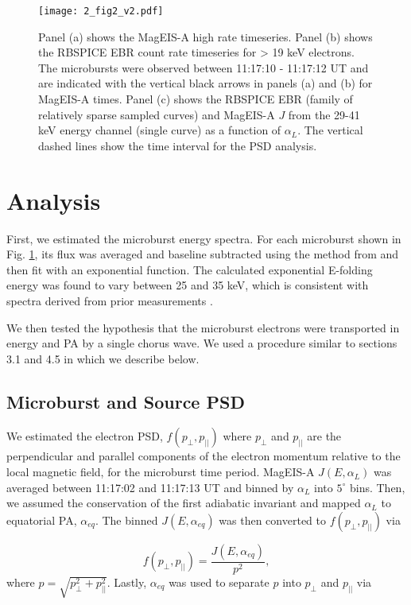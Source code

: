 \begin{figure}
\texttt{[image: 2\_fig2\_v2.pdf]}
\caption{Panel (a) shows the MagEIS-A high rate timeseries. Panel (b) shows the RBSPICE EBR count rate timeseries for > 19 keV electrons. The microbursts were observed between 11:17:10 - 11:17:12 UT and are indicated with the vertical black arrows in panels (a) and (b) for MagEIS-A times. Panel (c) shows the RBSPICE EBR (family of relatively sparse sampled curves) and MagEIS-A $J$ from the 29-41 keV energy channel (single curve) as a function of $\alpha_{L}$. The vertical dashed lines show the time interval for the PSD analysis.}
\label{fig2}
\end{figure}

\section{Analysis} \label{analysis} %
First, we estimated the microburst energy spectra. For each microburst shown in Fig. \ref{fig2}, its flux was averaged and baseline subtracted using the method from \citet{O'Brien2004} and then fit with an exponential function. The calculated exponential E-folding energy was found to vary between 25 and 35 keV, which is consistent with spectra derived from prior measurements \citep{Datta1997, Lee2005, Lee2012}.

We then tested the hypothesis that the microburst electrons were transported in energy and PA by a single chorus wave. We used a procedure similar to sections 3.1 and 4.5 in \citet{Meredith2002} which we describe below.

\subsection{Microburst and Source PSD} \label{psd_sec}
We estimated the electron PSD, $f(p_\perp, p_{||})$ where $p_\perp$ and $p_{||}$ are the perpendicular and parallel components of the electron momentum relative to the local magnetic field, for the microburst time period. MagEIS-A $J(E, \alpha_{L})$ was averaged between 11:17:02 and 11:17:13 UT and binned by $\alpha_{L}$ into $5^\circ$ bins. Then, we assumed the conservation of the first adiabatic invariant and mapped $\alpha_{L}$ to equatorial PA, $\alpha_{eq}$. The binned $J(E, \alpha_{eq})$ was then converted to $f(p_\perp, p_{||})$ via

\begin{equation}
f(p_\perp, p_{||}) = \frac{J(E, \alpha_{eq})}{p^2},
\label{psd_eq}
\end{equation} where $p = \sqrt{p_\perp^2 + p_{||}^2}$. Lastly, $\alpha_{eq}$ was used to separate $p$ into $p_\perp$ and $p_{||}$ via

